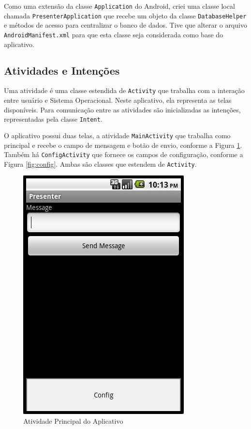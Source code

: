 \documentclass{article}
\begin{document}
Como uma extensão da classe \texttt{Application} do Android, criei uma classe
local chamada \texttt{PresenterApplication} que recebe um objeto da classe
\texttt{DatabaseHelper} e métodos de acesso para centralizar o banco de dados.
Tive que alterar o arquivo \texttt{AndroidManifest.xml} para que esta classe
seja considerada como base do aplicativo.

\subsection{Atividades e Intenções}

Uma atividade é uma classe estendida de \texttt{Activity} que trabalha com a
interação entre usuário e Sistema Operacional. Neste aplicativo, ela representa
as telas disponíveis. Para comunicação entre as atividades são inicializadas as
intenções, representadas pela classe \texttt{Intent}.

O aplicativo possui duas telas, a atividade \texttt{MainActivity} que trabalha
como principal e recebe o campo de mensagem e botão de envio, conforme a Figura
\ref{fig:main}. Também há \texttt{ConfigActivity} que fornece os campos de
configuração, conforme a Figura \ref{fig:config}. Ambas são classes que estendem
de \texttt{Activity}.

\begin{figure}
    \centering{}
    \includegraphics[scale=0.3]{screenshot02-main.jpg}
    \caption{Atividade Principal do Aplicativo}
    \label{fig:main}
\end{figure}
\end{document}
